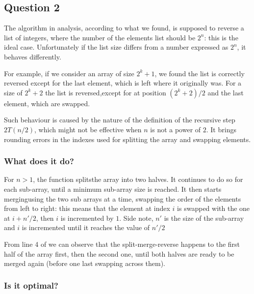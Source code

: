 \documentclass[12pt]{article}
\begin{document}
\subsection*{Question 2}

The algorithm in analysis, according to what we found, is supposed to reverse a list of integers, where the number of the elements
list should be $2^n$: this is the ideal case. Unfortunately if the list size differs from a number expressed as $2^n$, it behaves
differently. 
\vspace{.4cm}

For example, if we consider an array of size $2^k + 1$, we found the list is correctly reversed except for the last element, which
is left where it originally was. For a size of $2^k + 2$ the list is reversed,except for at position $(2^k + 2)/2$ and the last element, which are swapped.
\vspace{.4cm}

Such behaviour is caused by the nature of the definition of the recursive step $2T(n/2)$, which might not be effective 
when $n$ is not a power of $2$. It brings rounding errors in the indexes used for splitting the array and swapping elements.

\subsubsection*{What does it do?}

For $n > 1$, the  function splits\footnotemark[1]   the array into two halves. It continues to do so for each sub-array, 
until a minimum sub-array size is reached. It then starts merging\footnotemark[1] using  the two sub arrays at a time,
swapping the order of the elements from left to right: this means that the element at index $i$ is swapped with the one at 
$i + n'/2$, then $i$ is incremented by $1$. Side note, $n'$ is the size of the sub-array and $i$ is incremented until it reaches
the value of $n'/2$

From line 4 of  we can observe that the split-merge-reverse happens to the first half of the array first, 
then the second one, until both halves are ready to be merged again (before one last swapping across them). 

\subsubsection*{Is it optimal?}
\end{document}
